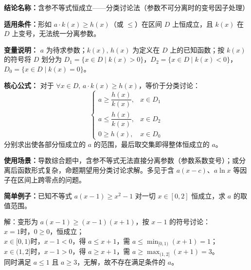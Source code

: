 \textbf{结论名称：}含参不等式恒成立——分类讨论法（参数不可分离时的变号因子处理）

\textbf{适用条件：}形如 \(a\cdot k(x) \ge h(x)\)（或 \(\le\)）在区间 \(D\) 上恒成立，且 \(k(x)\) 在 \(D\) 上变号，无法统一分离参数。

\textbf{变量说明：} \(a\) 为待求参数；\(k(x),\,h(x)\) 为定义在 \(D\) 上的已知函数；按 \(k(x)\) 的符号将 \(D\) 划分为 \(D_1=\{x\in D\mid k(x)>0\}\)，\(D_2=\{x\in D\mid k(x)<0\}\)，\(D_0=\{x\in D\mid k(x)=0\}\)。

\textbf{核心公式：}
对于 \(\forall x\in D,\, a\cdot k(x)\ge h(x)\)，等价于分类讨论：
\[
\boxed{
\begin{cases}
a\ge \dfrac{h(x)}{k(x)}, & x\in D_1 \\[6pt]
a\le \dfrac{h(x)}{k(x)}, & x\in D_2 \\[6pt]
0\ge h(x), & x\in D_0
\end{cases}
}
\]
分别求出使各部分恒成立的 \(a\) 的范围，最后取交集即得整体恒成立的 \(a\)。

\textbf{使用场景：}导数综合题中，含参不等式无法直接分离参数（参数系数变号）；或分离后函数形式复杂，命题期望用分类讨论求解。多见于含 \(a(x-c)\)、\(a\ln x\) 等因子在区间上跨零点的问题。

\textbf{简单例子：}已知不等式 \(a(x-1)\ge x^2-1\) 对一切 \(x\in[0,2]\) 恒成立，求 \(a\) 的取值范围。

解：变形为 \(a(x-1)\ge (x-1)(x+1)\)，按 \(x-1\) 的符号讨论：\\
\(x=1\)时，\(0\ge 0\)，恒成立；\\
\(x\in[0,1)\)时，\(x-1<0\)，得 \(a\le x+1\)，需 \(a\le \min_{[0,1)}(x+1)=1\)；\\
\(x\in(1,2]\)时，\(x-1>0\)，得 \(a\ge x+1\)，需 \(a\ge \max_{(1,2]}(x+1)=3\)。\\
同时满足 \(a\le 1\) 且 \(a\ge 3\)，无解，故不存在满足条件的 \(a\)。